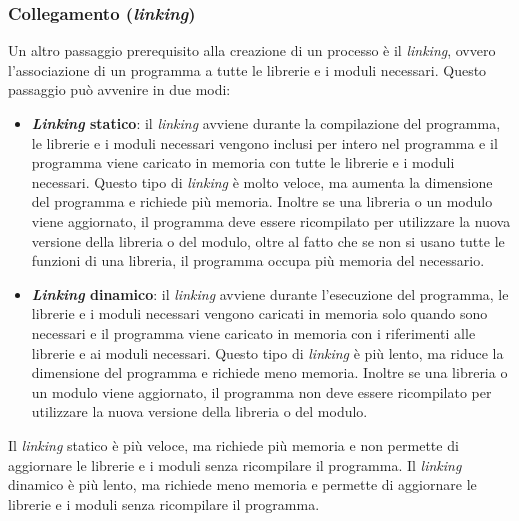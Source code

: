         \subsubsection{Collegamento (\textit{linking})}
            Un altro passaggio prerequisito alla creazione di un processo è il \textit{linking}, ovvero l'associazione di un programma a tutte le librerie e i moduli necessari. Questo passaggio può avvenire in due modi:
            \begin{itemize}
                \item \textbf{\textit{Linking} statico}: il \textit{linking} avviene durante la compilazione del programma, le librerie e i moduli necessari vengono inclusi per intero nel programma e il programma viene caricato in memoria con tutte le librerie e i moduli necessari. Questo tipo di \textit{linking} è molto veloce, ma aumenta la dimensione del programma e richiede più memoria. Inoltre se una libreria o un modulo viene aggiornato, il programma deve essere ricompilato per utilizzare la nuova versione della libreria o del modulo, oltre al fatto che se non si usano tutte le funzioni di una libreria, il programma occupa più memoria del necessario.
                \item \textbf{\textit{Linking} dinamico}: il \textit{linking} avviene durante l'esecuzione del programma, le librerie e i moduli necessari vengono caricati in memoria solo quando sono necessari e il programma viene caricato in memoria con i riferimenti alle librerie e ai moduli necessari. Questo tipo di \textit{linking} è più lento, ma riduce la dimensione del programma e richiede meno memoria. Inoltre se una libreria o un modulo viene aggiornato, il programma non deve essere ricompilato per utilizzare la nuova versione della libreria o del modulo.
            \end{itemize}
            Il \textit{linking} statico è più veloce, ma richiede più memoria e non permette di aggiornare le librerie e i moduli senza ricompilare il programma. Il \textit{linking} dinamico è più lento, ma richiede meno memoria e permette di aggiornare le librerie e i moduli senza ricompilare il programma.

